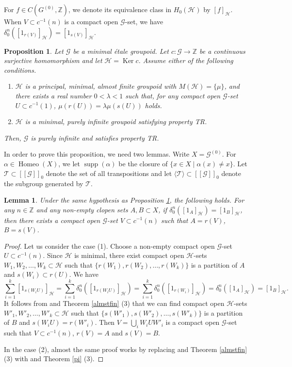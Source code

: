 \documentclass[11pt]{article}
\newtheorem{lemma}[theorem]{Lemma}
\newtheorem{proposition}[theorem]{Proposition}
\theoremstyle{definition}
\numberwithin{equation}{section}
\newcommand{\Homeo}{\operatorname{Homeo}}
\newcommand{\Ker}{\operatorname{Ker}}
\newcommand{\supp}{\operatorname{supp}}
\newcommand{\G}{\mathcal{G}}
\renewcommand{\H}{\mathcal{H}}
\newcommand{\Z}{\mathbb{Z}}
\begin{document}
For $f\in C(G^{(0)},\Z)$, 
we denote its equivalence class in $H_0(\H)$ by $[f]_\H$. 
When $V\subset c^{-1}(n)$ is a compact open $\G$-set, 
we have $\delta_0^n([1_{r(V)}]_\H)=[1_{s(V)}]_\H$. 

\begin{proposition}\label{GhasTR}
Let $\G$ be a minimal \'etale groupoid. 
Let $c:\G\to\Z$ be a continuous surjective homomorphism and 
let $\H=\Ker c$. 
Assume either of the following conditions. 
\begin{enumerate}
\item $\H$ is a principal, minimal, almost finite groupoid 
with $M(\H)=\{\mu\}$, 
and there exists a real number $0<\lambda<1$ such that, 
for any compact open $\G$-set $U\subset c^{-1}(1)$, 
$\mu(r(U))=\lambda\mu(s(U))$ holds. 
\item $\H$ is a minimal, purely infinite groupoid 
satisfying property TR. 
\end{enumerate}
Then, $\G$ is purely infinite and satisfies property TR. 
\end{proposition}

In order to prove this proposition, we need two lemmas. 
Write $X=\G^{(0)}$. 
For $\alpha\in\Homeo(X)$, we let $\supp(\alpha)$ be 
the closure of $\{x\in X\mid\alpha(x)\neq x\}$. 
Let $\mathcal{T}\subset[[\G]]_0$ denote the set of all transpositions and 
let $\langle\mathcal{T}\rangle\subset[[\G]]_0$ denote 
the subgroup generated by $\mathcal{T}$. 

\begin{lemma}\label{LemAforGhasTR}
Under the same hypothesis as Proposition \ref{GhasTR}, the following holds. 
For any $n\in\Z$ and any non-empty clopen sets $A,B\subset X$, 
if $\delta_0^n([1_A]_\H)=[1_B]_\H$, 
then there exists a compact open $\G$-set $V\subset c^{-1}(n)$ 
such that $A=r(V)$, $B=s(V)$. 
\end{lemma}
\begin{proof}
Let us consider the case (1). 
Choose a non-empty compact open $\G$-set $U\subset c^{-1}(n)$. 
Since $\H$ is minimal, 
there exist compact open $\H$-sets $W_1,W_2,\dots,W_k\subset\H$ 
such that $\{r(W_1),r(W_2),\dots,r(W_k)\}$ is a partition of $A$ 
and $s(W_i)\subset r(U)$. 
We have 
\[
\sum_{i=1}^k[1_{s(W_iU)}]_\H=\sum_{i=1}^k\delta_0^n([1_{r(W_iU)}]_\H)
=\sum_{i=1}^k\delta_0^n([1_{r(W_i)}]_\H)=\delta_0^n([1_A]_\H)=[1_B]_\H. 
\]
It follows from \cite[Lemma 6.7]{M12PLMS} and Theorem \ref{almstfin} (3) that 
we can find compact open $\H$-sets $W'_1,W'_2,\dots,W'_k\subset\H$ 
such that $\{s(W'_1),s(W'_2),\dots,s(W'_k)\}$ is a partition of $B$ 
and $s(W_iU)=r(W'_i)$. 
Then $V=\bigcup_iW_iUW'_i$ is a compact open $\G$-set 
such that $V\subset c^{-1}(n)$, $r(V)=A$ and $s(V)=B$. 

In the case (2), 
almost the same proof works 
by replacing \cite[Lemma 6.7]{M12PLMS} and Theorem \ref{almstfin} (3) 
with \cite[Proposition 4.11]{M15crelle} and Theorem \ref{pi} (3). 
\end{proof}
\end{document}
